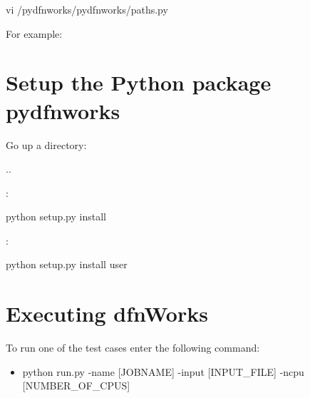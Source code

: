 \documentclass[letterpaper,10pt,english]{sphinxmanual}
\begin{document}
\begin{sphinxVerbatim}[commandchars=\\\{\}]
\PYGZdl{} vi /pydfnworks/pydfnworks/paths.py
\end{sphinxVerbatim}

For example:

\begin{sphinxVerbatim}[commandchars=\\\{\}]
\PYG{p}{[}\PYG{p}{]}  
\end{sphinxVerbatim}


\section{Setup the Python package pydfnworks}
\label{\detokenize{tutorial:setup-the-python-package-pydfnworks}}
Go up a directory:

\begin{sphinxVerbatim}[commandchars=\\\{\}]
\PYGZdl{}  ..
\end{sphinxVerbatim}

:

\begin{sphinxVerbatim}[commandchars=\\\{\}]
\PYGZdl{} python setup.py install
\end{sphinxVerbatim}

:

\begin{sphinxVerbatim}[commandchars=\\\{\}]
\PYGZdl{} python setup.py install \PYGZhy{}\PYGZhy{}user
\end{sphinxVerbatim}


\section{Executing dfnWorks}
\label{\detokenize{tutorial:executing-dfnworks}}
To run one of the test cases enter the following command:
\begin{itemize}
\item {} 
python run.py -name {[}JOBNAME{]} -input {[}INPUT\_FILE{]} -ncpu {[}NUMBER\_OF\_CPUS{]}

\end{itemize}
\end{document}
